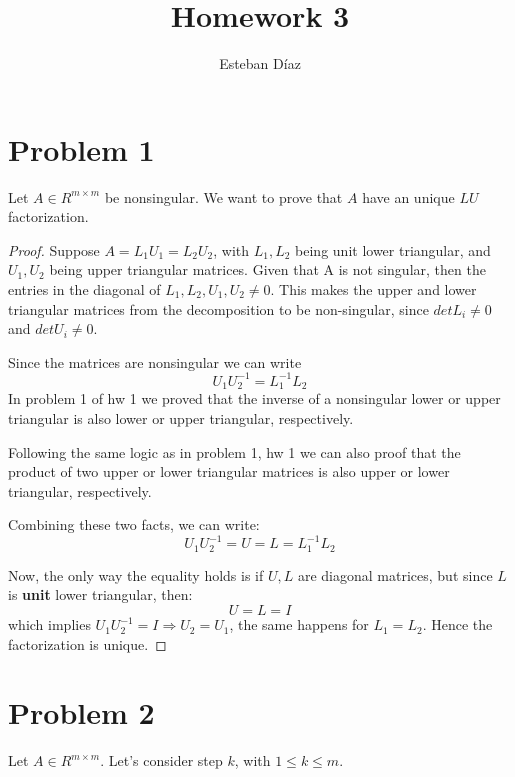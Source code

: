 \documentclass[10pt]{article}
\author{Esteban D\'{i}az}
\title{Homework 3}{}
\begin{document}
\maketitle

\section{Problem 1}
Let $A\in R^{m \times m}$ be nonsingular. We want to prove that $A$ have an unique
$LU$ factorization. 

\begin{proof}
  Suppose $A=L_1U_1 = L_2U_2$, with $L_1,L_2$ being unit lower
triangular, and $U_1,U_2$ being upper triangular matrices. Given that
A is not singular, then the entries in 
the diagonal of $L_1,L_2,U_1,U_2 \neq 0$. This makes the upper and lower 
triangular matrices from the decomposition to be non-singular, since
$det L_i \neq 0$ and $det U_i \neq 0$.

Since the matrices are nonsingular we can write
\[
  U_1U_2^{-1} = L_1^{-1}L_2
\]
In problem 1 of hw 1 we proved that the inverse of a nonsingular
 lower or upper triangular is also lower or upper triangular, respectively.

Following the same logic as in problem 1, hw 1 we can also proof that
the product of two upper or lower triangular matrices is also 
upper or lower triangular, respectively.

Combining these two facts, we can write:
\[
  U_1U_2^{-1} = U= L= L_1^{-1}L_2
\]

Now, the only way the equality holds is if $U,L$ are diagonal matrices,
but since $L$ is \textbf{unit} lower triangular, then:
\[
  U = L = I
\]
which implies $U_1U_2^{-1}=I \Rightarrow U_2=U_1$, the same happens
for $L_1 = L_2$. Hence the factorization is unique.
\end{proof}


\section{Problem 2}
Let $A\in R^{m \times m}$. Let's consider step $k$, with $1\leq k\leq m$.
\end{document}
